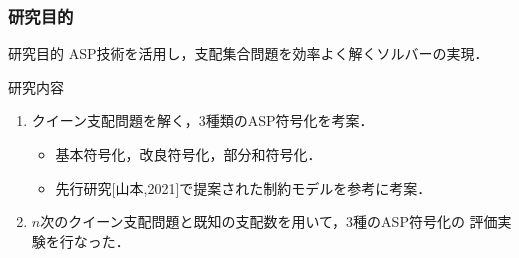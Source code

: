 \documentclass[dvipdfmx,10pt]{beamer}
\begin{document}
%
%

\begin{frame}\frametitle{研究目的}
 \begin{alertblock}{研究目的}
  ASP技術を活用し，支配集合問題を効率よく解くソルバーの実現．
 \end{alertblock}
 \begin{block}{研究内容}
  \begin{enumerate}
   \item クイーン支配問題を解く，3種類のASP符号化を考案．
	 \begin{itemize}
	  \item 基本符号化，改良符号化，部分和符号化．
	  \item 先行研究[山本,2021]で提案された制約モデルを参考に考案．
	 \end{itemize}
   \item $n$次のクイーン支配問題と既知の支配数を用いて，3種のASP符号化の
	 評価実験を行なった．
  \end{enumerate}
 \end{block}
\end{frame}

%
%
\end{document}
